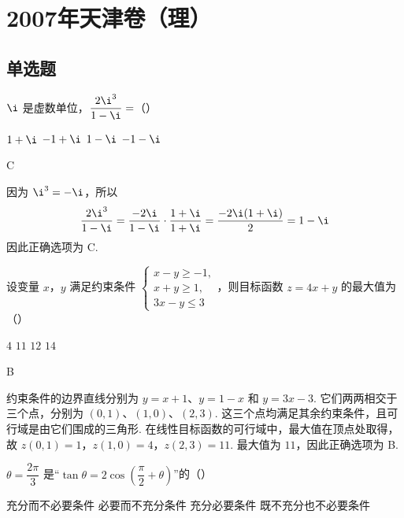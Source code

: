\chapter{2007年天津卷（理）}

\section{单选题}

\begin{problem}
\(\i\) 是虚数单位，\(\dfrac{2\i^3}{1 - \i} =\)（\quad）

\choices
    {\(1 + \i\)}
    {\(-1 + \i\)}
    {\(1 - \i\)}
    {\(-1 - \i\)}
\end{problem}

\begin{answer}
C
\end{answer}

\begin{solution}
因为 \(\i^3=-\i\)，所以
\[
\frac{2\i^3}{1-\i}=\frac{-2\i}{1-\i}\cdot\frac{1+\i}{1+\i}=\frac{-2\i(1+\i)}{2}=1-\i
\]
因此正确选项为 C.
\end{solution}

\begin{problem}
设变量 \(x\)，\(y\) 满足约束条件 \(\begin{cases}
x-y\geqslant -1,\\
x+y\geqslant 1,\\
3x-y\leqslant 3
\end{cases}\)，则目标函数 \(z = 4x + y\) 的最大值为（\quad）

\choices
    {\(4\)}
    {\(11\)}
    {\(12\)}
    {\(14\)}
\end{problem}

\begin{answer}
B
\end{answer}

\begin{solution}
约束条件的边界直线分别为 \(y=x+1\)、\(y=1-x\) 和 \(y=3x-3\). 它们两两相交于三个点，分别为 \((0,1)\)、\((1,0)\)、\((2,3)\).
这三个点均满足其余约束条件，且可行域是由它们围成的三角形. 在线性目标函数的可行域中，最大值在顶点处取得，故
\(z(0,1)=1\)，\(z(1,0)=4\)，\(z(2,3)=11\).
最大值为 \(11\)，因此正确选项为 B.
\end{solution}

\begin{problem}
\(\theta = \dfrac{2\pi}{3}\) 是“\(\tan \theta = 2\cos\left(\dfrac{\pi}{2} + \theta\right)\)”的（\quad）

\choices
    {充分而不必要条件}
    {必要而不充分条件}
    {充分必要条件}
    {既不充分也不必要条件}
\end{problem}

